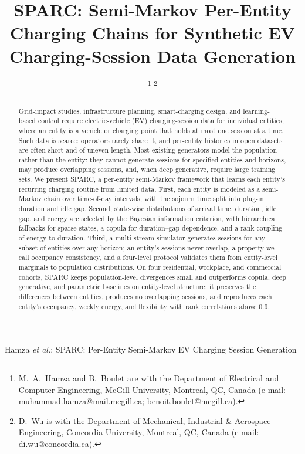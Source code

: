 \documentclass[journal]{IEEEtran}
\begin{document}
\title{SPARC: Semi-Markov Per-Entity Charging Chains for Synthetic EV Charging-Session Data Generation}
\author{
\thanks{M.~A.~Hamza and B.~Boulet are with the Department of Electrical and Computer Engineering, McGill University, Montreal, QC, Canada (e-mail: muhammad.hamza@mail.mcgill.ca; benoit.boulet@mcgill.ca).}%
\thanks{D.~Wu is with the Department of Mechanical, Industrial \& Aerospace Engineering, Concordia University, Montreal, QC, Canada (e-mail: di.wu@concordia.ca).}}

%
{Hamza \MakeLowercase{\textit{et al.}}: SPARC: Per-Entity Semi-Markov EV Charging Session Generation}

\maketitle

\begin{abstract}
Grid-impact studies, infrastructure planning, smart-charging design, and learning-based control require electric-vehicle (EV) charging-session data for individual entities, where an entity is a vehicle or charging point that holds at most one session at a time. Such data is scarce: operators rarely share it, and per-entity histories in open datasets are often short and of uneven length. Most existing generators model the population rather than the entity: they cannot generate sessions for specified entities and horizons, may produce overlapping sessions, and, when deep generative, require large training sets. We present SPARC, a per-entity semi-Markov framework that learns each entity's recurring charging routine from limited data. First, each entity is modeled as a semi-Markov chain over time-of-day intervals, with the sojourn time split into plug-in duration and idle gap. Second, state-wise distributions of arrival time, duration, idle gap, and energy are selected by the Bayesian information criterion, with hierarchical fallbacks for sparse states, a copula for duration--gap dependence, and a rank coupling of energy to duration. Third, a multi-stream simulator generates sessions for any subset of entities over any horizon; an entity's sessions never overlap, a property we call occupancy consistency, and a four-level protocol validates them from entity-level marginals to population distributions. On four residential, workplace, and commercial cohorts, SPARC keeps population-level divergences small and outperforms copula, deep generative, and parametric baselines on entity-level structure: it preserves the differences between entities, produces no overlapping sessions, and reproduces each entity's occupancy, weekly energy, and flexibility with rank correlations above $0.9$.
\end{abstract}
\end{document}
